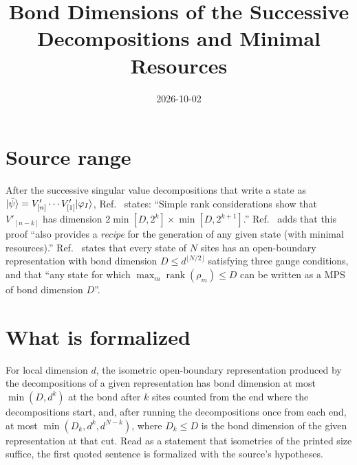 \documentclass{article}
\title{Bond Dimensions of the Successive Decompositions and Minimal Resources}
\author{}
\date{2026-10-02}
\begin{document}
\maketitle
{}

\section{Source range}

After the successive singular value decompositions that write a state as
$|\tilde\psi\rangle=V'_{[n]}\cdots V'_{[1]}|\varphi_I\rangle$,
Ref.~\cite[lines~200--202 of the source]{Schoen2005Sequential} states:
``Simple rank considerations show that $V'_{[n-k]}$ has dimension
$2\min[D,2^k]\times\min[D,2^{k+1}]$.'' Ref.~\cite[Section~5.1,
lines~1574--1577]{PerezGarcia2007Matrix} adds that this proof ``also provides
a \emph{recipe} for the generation of any given state (with minimal
resources).'' Ref.~\cite[lines~431--458]{PerezGarcia2007Matrix} states that
every state of $N$ sites has an open-boundary representation with bond
dimension $D\le d^{\lfloor N/2\rfloor}$ satisfying three gauge conditions, and
that ``any state for which $\max_m \operatorname{rank}(\rho_m)\le D$ can be
written as a MPS of bond dimension $D$''.

\section{What is formalized}

For local dimension $d$, the isometric open-boundary representation produced
by the decompositions of a given representation has bond dimension at most
$\min(D,d^k)$ at the bond after $k$ sites counted from the end where the
decompositions start, and, after running the decompositions once from each
end, at most $\min(D_k,d^k,d^{N-k})$, where $D_k\le D$ is the bond dimension of
the given representation at that cut. Read as a statement that isometries of
the printed size suffice, the first quoted sentence is formalized with the
source's hypotheses.
\end{document}
